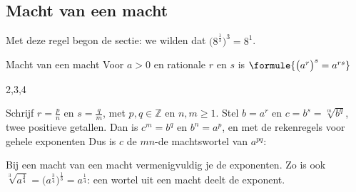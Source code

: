 \begin{oefeningen}
\end{oefeningen}

\subsection{Macht van een macht}

Met deze regel begon de sectie: we wilden dat $\bigl(8^{\frac13}\bigr)^3 = 8^1$. 

\begin{theorie}
\begin{stelling}{Macht van een macht}
Voor $a > 0$ en rationale $r$ en $s$ is \qquad $\formule{\bigl(a^r\bigr)^s = a^{rs}}$
\end{stelling}
\begin{alleenvoor}{2,3,4}
\begin{bewijs}
Schrijf $r = \frac{p}{n}$ en $s = \frac{q}{m}$, met $p, q \in \mathbb{Z}$ en $n, m \geqslant 1$. Stel $b = a^r$ en $c = b^s = \sqrt[m]{b^q}$, twee positieve getallen. Dan is $c^m = b^q$ en $b^n = a^p$, en met de rekenregels voor gehele exponenten
Dus is $c$ de $mn$-de machtswortel van $a^{pq}$:
\end{bewijs}
\end{alleenvoor}
\end{theorie}

Bij een macht van een macht vermenigvuldig je de exponenten. Zo is ook $\sqrt[3]{a^{\frac34}} = \bigl(a^{\frac34}\bigr)^{\frac13} = a^{\frac14}$: een wortel uit een macht deelt de exponent.


